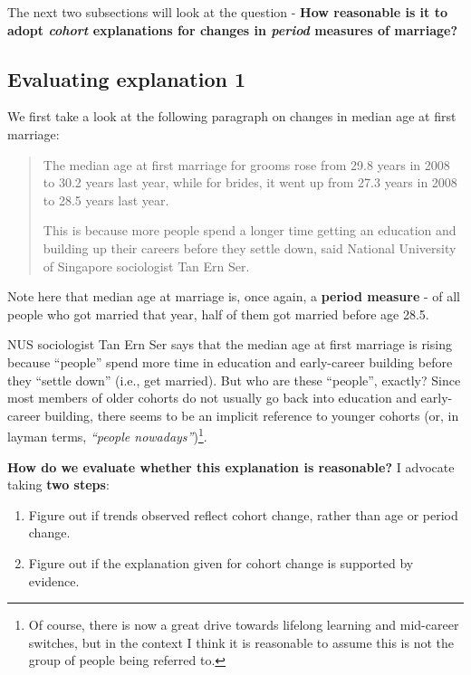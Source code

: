\documentclass[
  openany]{book}
\providecommand{\tightlist}{%
  \setlength{\itemsep}{0pt}\setlength{\parskip}{0pt}}
\begin{document}
The next two subsections will look at the question - \textbf{How reasonable is it to adopt \emph{cohort} explanations for changes in \emph{period} measures of marriage?}

\hypertarget{evaluating-explanation-1}{%
\subsection{Evaluating explanation 1}\label{evaluating-explanation-1}}

We first take a look at the following paragraph on changes in median age at first marriage:

\begin{quote}
The median age at first marriage for grooms rose from 29.8 years in 2008 to 30.2 years last year, while for brides, it went up from 27.3 years in 2008 to 28.5 years last year.

This is because more people spend a longer time getting an education and building up their careers before they settle down, said National University of Singapore sociologist Tan Ern Ser.
\end{quote}

Note here that median age at marriage is, once again, a \textbf{period measure} - of all people who got married that year, half of them got married before age 28.5.

NUS sociologist Tan Ern Ser says that the median age at first marriage is rising because ``people'' spend more time in education and early-career building before they ``settle down'' (i.e., get married). But who are these ``people'', exactly? Since most members of older cohorts do not usually go back into education and early-career building, there seems to be an implicit reference to younger cohorts (or, in layman terms, \emph{``people nowadays''})\footnote{Of course, there is now a great drive towards lifelong learning and mid-career switches, but in the context I think it is reasonable to assume this is not the group of people being referred to.}.

\textbf{How do we evaluate whether this explanation is reasonable?} I advocate taking \textbf{two steps}:

\begin{enumerate}
\def\labelenumi{\arabic{enumi}.}
\tightlist
\item
  Figure out if trends observed reflect cohort change, rather than age or period change.
\item
  Figure out if the explanation given for cohort change is supported by evidence.
\end{enumerate}
\end{document}

